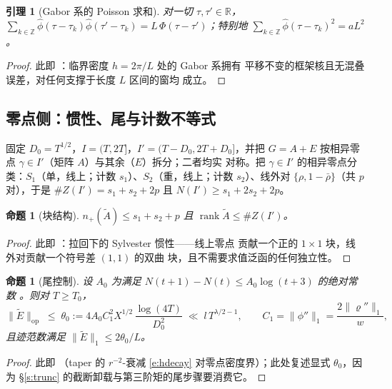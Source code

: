 \documentclass[11pt]{article}
\numberwithin{equation}{section}
\newtheorem{lemma}[theorem]{引理}
\newtheorem{proposition}[theorem]{命题}
\theoremstyle{definition}
\theoremstyle{remark}
\begin{document}
\begin{lemma}[Gabor 系的 Poisson 求和]\label{l:gabor}
对一切 $\tau,\tau'\in\mathbb R$，
$\sum_{k\in\mathbb Z}\widehat\phi(\tau-\tau_k)
\widehat\phi(\tau'-\tau_k)=L\,\Phi(\tau-\tau')$；特别地
$\sum_{k\in\mathbb Z}\widehat\phi(\tau-\tau_k)^{2}=aL^{2}$。
\end{lemma}

\begin{proof}
此即 \cite[引理~2.2]{C26}：临界密度 $h=2\pi/L$ 处的 Gabor 系拥有
平移不变的框架核且无混叠误差，对任何支撑于长度 $L$ 区间的窗均
成立。
\end{proof}

\subsection{零点侧：惯性、尾与计数不等式}\label{s:frame:count}

固定 $D_0=T^{1/2}$，$I=(T,2T]$，$I'=(T-D_0,2T+D_0]$，并把 $G=A+E$
按相异零点 $\gamma\in I'$（矩阵 $A$）与其余（$E$）拆分；二者均实
对称。把 $\gamma\in I'$ 的相异零点分类：$S_1$（单，线上；计数
$s_1$）、$S_2$（重，线上；计数 $s_2$）、线外对
$\{\rho,1-\bar\rho\}$（共 $p$ 对），于是 $\#Z(I')=s_1+s_2+2p$ 且
$N(I')\ge s_1+2s_2+2p$。

\begin{proposition}[块结构]\label{p:inertiaA}
$n_+(\widetilde A)\le s_1+s_2+p$ 且
$\operatorname{rank}\widetilde A\le\#Z(I')$。
\end{proposition}

\begin{proof}
此即 \cite[命题~4.1]{C26}：拉回下的 Sylvester 惯性——线上零点
贡献一个正的 $1\times1$ 块，线外对贡献一个符号差 $(1,1)$ 的双曲
块，且不需要求值泛函的任何独立性。
\end{proof}

\begin{proposition}[尾控制]\label{p:tail}
设 $A_0$ 为满足 $N(t+1)-N(t)\le A_0\log(t+3)$ 的绝对常数
\cite[定理~9.2]{Tit86}。则对 $T\ge T_0$，
\[
\|\widetilde E\|_{\mathrm{op}}\;\le\;\theta_0
:=4A_0C_1^{2}X^{1/2}\,\frac{\log(4T)}{D_0^{2}}
\;\ll\;l\,T^{\lambda/2-1},
\qquad C_1=\|\phi''\|_1=\frac{2\|\varrho''\|_1}{w},
\]
且迹范数满足 $\|\widetilde E\|_1\le2\theta_0/L$。
\end{proposition}

\begin{proof}
此即 \cite[命题~4.2]{C26}（taper 的 $r^{-2}$-衰减
\eqref{e:hdecay} 对零点密度界）；此处复述显式 $\theta_0$，因为
\S\ref{s:trunc} 的截断卸载与第三阶矩的尾步骤要消费它。
\end{proof}
\end{document}
